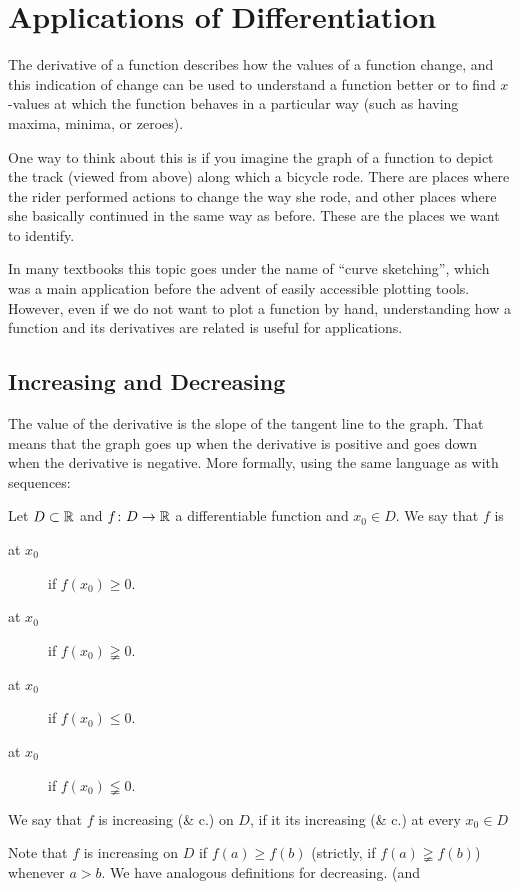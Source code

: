 \chapter{Applications of Differentiation}
\label{chappdiff}

The derivative of a function describes how the values of a function change,
and this indication of change can be used to understand a function better or
to find $x$-values at which the function behaves in a particular way (such
as having maxima, minima, or zeroes).

One way to think about this is if you imagine the graph of a function to
depict the track (viewed from above) along which a bicycle rode.
There are places where the rider performed actions to change the way she
rode, and other places where she basically continued in the same way as
before. These are the places we want to identify.

In many textbooks this topic goes under the name of ``curve sketching'',
which was a main application before the advent of easily accessible plotting
tools. However, even if we do not want to plot a function by hand,
understanding how a function and its derivatives are related is useful for
applications.

\section{Increasing and Decreasing}
\label{secincr}

The value of the derivative is the slope of the tangent line to the graph.
That means that the graph goes up
when the derivative is positive and goes down
when the derivative is negative. More formally, using the same language as
with sequences:
\begin{defn}
Let $D\subset{\mathbb R}$ and $f\colon D\to{\mathbb R}$ a differentiable function and $x_0\in
D$. We say that $f$ is
\begin{description}
\item[ at $x_0$] if $f(x_0)\ge 0$.
\item[ at $x_0$] if $f(x_0)\gneqq 0$.
\item[ at $x_0$] if $f(x_0)\le 0$.
\item[ at $x_0$] if $f(x_0)\lneqq 0$.
\end{description}
We say that $f$ is increasing (\& c.) on $D$, if it its increasing
(\& c.) at every $x_0\in D$
\end{defn}
Note that $f$ is increasing on $D$ if $f(a)\ge f(b)$ (strictly, if
$f(a)\gneqq f(b)$) whenever $a>b$. We have analogous definitions for
decreasing. (and

